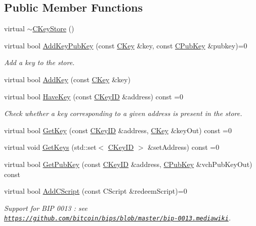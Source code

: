 \subsection*{Public Member Functions}
\begin{DoxyCompactItemize}
\item 
virtual \mbox{\hyperlink{class_c_key_store_a9bfaef2bcd6effc467a96043f44044a0}{$\sim$\+C\+Key\+Store}} ()
\item 
virtual bool \mbox{\hyperlink{class_c_key_store_a1956e4f5860ded321d6f697047d8236a}{Add\+Key\+Pub\+Key}} (const \mbox{\hyperlink{class_c_key}{C\+Key}} \&key, const \mbox{\hyperlink{class_c_pub_key}{C\+Pub\+Key}} \&pubkey)=0
\begin{DoxyCompactList}\small\item\em Add a key to the store. \end{DoxyCompactList}\item 
virtual bool \mbox{\hyperlink{class_c_key_store_a0b4ca43724cfcc6e2ea70c0baa192750}{Add\+Key}} (const \mbox{\hyperlink{class_c_key}{C\+Key}} \&key)
\item 
virtual bool \mbox{\hyperlink{class_c_key_store_a9398451d4270fae27b29f686a9d43a65}{Have\+Key}} (const \mbox{\hyperlink{class_c_key_i_d}{C\+Key\+ID}} \&address) const =0
\begin{DoxyCompactList}\small\item\em Check whether a key corresponding to a given address is present in the store. \end{DoxyCompactList}\item 
virtual bool \mbox{\hyperlink{class_c_key_store_a2dffca468fef2e5da2e42a7c983d968a}{Get\+Key}} (const \mbox{\hyperlink{class_c_key_i_d}{C\+Key\+ID}} \&address, \mbox{\hyperlink{class_c_key}{C\+Key}} \&key\+Out) const =0
\item 
virtual void \mbox{\hyperlink{class_c_key_store_aca5044014720308f191113e7ba297d13}{Get\+Keys}} (std\+::set$<$ \mbox{\hyperlink{class_c_key_i_d}{C\+Key\+ID}} $>$ \&set\+Address) const =0
\item 
virtual bool \mbox{\hyperlink{class_c_key_store_ab83687ea4c9df138b21f6ec3e9809f42}{Get\+Pub\+Key}} (const \mbox{\hyperlink{class_c_key_i_d}{C\+Key\+ID}} \&address, \mbox{\hyperlink{class_c_pub_key}{C\+Pub\+Key}} \&vch\+Pub\+Key\+Out) const
\item 
virtual bool \mbox{\hyperlink{class_c_key_store_a2fb2e02e8cdc364607efd5ebb14b8064}{Add\+C\+Script}} (const C\+Script \&redeem\+Script)=0
\begin{DoxyCompactList}\small\item\em Support for B\+IP 0013 \+: see \href{https://github.com/bitcoin/bips/blob/master/bip-0013.mediawiki}{\tt https\+://github.\+com/bitcoin/bips/blob/master/bip-\/0013.\+mediawiki}. \end{DoxyCompactList}\item 

\end{DoxyCompactItemize}
